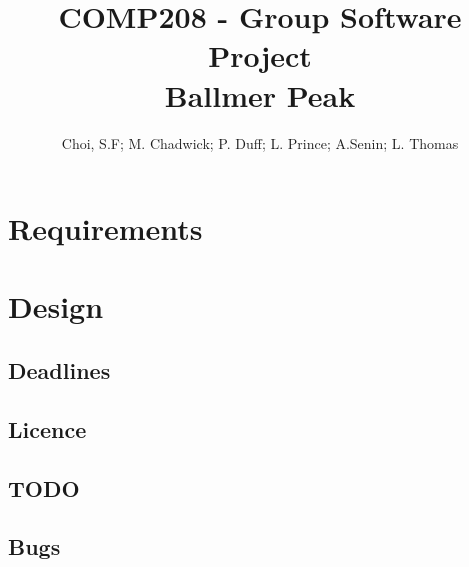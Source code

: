 \documentclass[openany]{book}
\title{COMP208 - Group Software Project\\Ballmer Peak}
\author{Choi, S.F; M. Chadwick; P. Duff; L. Prince; A.Senin; L. Thomas}
\begin{document}
\maketitle
\tableofcontents

\part{Requirements}


\part{Design}


\begin{appendices}
\appendixpage %
\noappendicestocpagenum %
\addappheadtotoc %

\chapter{Deadlines}

\chapter{Licence}

\chapter{TODO}

\chapter{Bugs}

\end{appendices}

\listoftodos
\todototoc

\printbibliography
\end{document}
